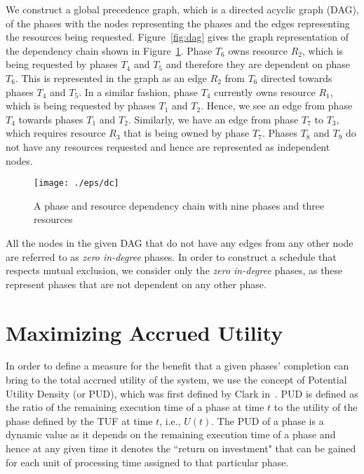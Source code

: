 \documentclass[12pt,dvips]{report}
\begin{document}
We construct a global precedence graph, which is a directed acyclic graph (DAG), of the phases with the nodes representing the phases and the edges representing the resources being requested. Figure~\ref{fig:dag} gives the graph representation of the dependency chain shown in Figure~\ref{fig:chain}. Phase $T_6$ owns resource $R_2$, which is being requested by phases $T_4$ and $T_5$ and therefore they are dependent on phase $T_6$. This is represented in the graph as an edge $R_2$ from $T_6$ directed towards phases $T_4$ and $T_5$. In a similar fashion, phase $T_4$ currently owns resource $R_1$, which is being requested by phases $T_1$ and $T_2$. Hence, we see an edge from phase $T_4$ towards phases $T_1$ and $T_2$. Similarly, we have an edge from phase $T_7$ to $T_3$, which requires resource $R_3$ that is being owned by phase $T_7$. Phases $T_8$ and $T_9$ do not have any resources requested and hence are represented as independent nodes.

\begin{figure} [!t]
  \centering
   \texttt{[image: ./eps/dc]}
  \caption{A phase and resource dependency chain with nine phases and three resources}
  \label{fig:chain}
\end{figure}

All the nodes in the given DAG that do not have any edges from any other node are referred to as \textit{zero in-degree} phases. In order to construct a schedule that respects mutual exclusion, we consider only the \textit{zero in-degree} phases, as these represent phases that are not dependent on any other phase.

\section{Maximizing Accrued Utility}\label{algo:max-ua}

In order to define a measure for the benefit that a given phases' completion can bring to the total accrued utility of the system, we use the concept of Potential Utility Density (or PUD), which was first defined by Clark in~\cite{DASA}. PUD is defined as the ratio of the remaining execution time of a phase at time $t$ to the utility of the phase defined by the TUF at time $t$, i.e., $U(t)$. The PUD of a phase is a dynamic value as it depends on the remaining execution time of a phase and hence at any given time it denotes the ``return on investment" that can be gained for each unit of processing time assigned to that particular phase.
\end{document}
